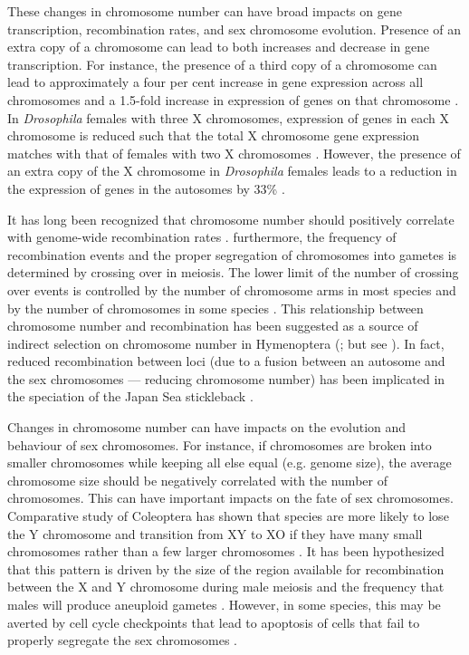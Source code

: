 These changes in chromosome number can have broad impacts on gene transcription, recombination rates, and sex chromosome evolution.
Presence of an extra copy of a chromosome can lead to both increases and decrease in gene transcription.  
For instance, the presence of a third copy of a chromosome can lead to approximately a four per cent increase in gene expression across all chromosomes and a 1.5-fold increase in expression of genes on that chromosome \citep{lockstone2007, williams2008aneuploidy}.
In \textit{Drosophila} females with three X chromosomes, expression of genes in each X chromosome is reduced such that the total X chromosome gene expression matches with that of females with two X chromosomes \citep{sun2013dosage}.
However, the presence of an extra copy of the X chromosome in \textit{Drosophila} females leads to a reduction in the expression of genes in the autosomes by 33\% \citep{sun2013dosage}. 

It has long been recognized that chromosome number should positively correlate with genome-wide recombination rates \citep{stebbins1958}.
furthermore, the frequency of recombination events and the proper segregation of chromosomes into gametes is determined by crossing over in meiosis.
The lower limit of the number of crossing over events is controlled by the number of chromosome arms in most species and by the number of chromosomes in some species \citep{dumont2017req}.
This relationship between chromosome number and recombination has been suggested as a source of indirect selection on chromosome number in Hymenoptera (\citealt{sherman1979}; but see \citealt{ross2015}).
In fact, reduced recombination between loci (due to a fusion between an autosome and the sex chromosomes --- reducing chromosome number) has been implicated in the speciation of the Japan Sea stickleback \citep{kitano2012}. 

Changes in chromosome number can have impacts on the evolution and behaviour of sex chromosomes. 
For instance, if chromosomes are broken into smaller chromosomes while keeping all else equal (e.g. genome size), the average chromosome size should be negatively correlated with the number of chromosomes.
This can have important impacts on the fate of sex chromosomes.
Comparative study of Coleoptera has shown that species are more likely to lose the Y chromosome and transition from XY to XO if they have many small chromosomes rather than a few larger chromosomes \citep{blackmon2015bioessay}.
It has been hypothesized that this pattern is driven by the size of the region available for recombination between the X and Y chromosome during male meiosis and the frequency that males will produce aneuploid gametes \citep{blackmon2014}.
However, in some species, this may be averted by cell cycle checkpoints that lead to apoptosis of cells that fail to properly segregate the sex chromosomes \citep{dumont2017par}.


